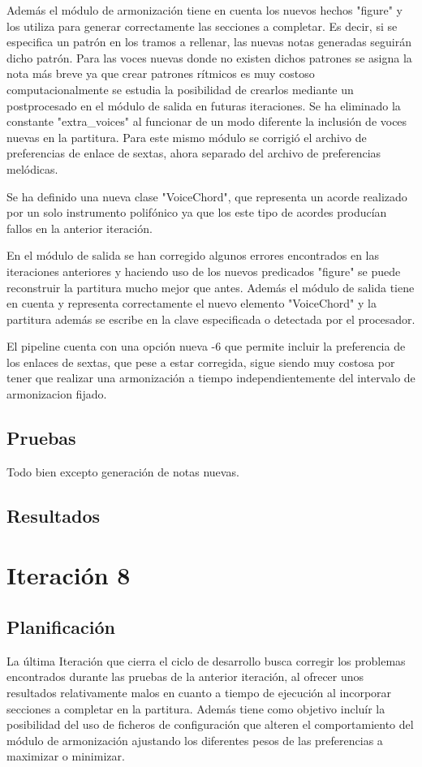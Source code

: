 Además el módulo de armonización tiene en cuenta los nuevos hechos "figure" y los utiliza para generar correctamente las secciones a completar. Es decir, si se especifica un patrón en los tramos a rellenar, las nuevas notas generadas seguirán dicho patrón. Para las voces nuevas donde no existen dichos patrones se asigna la nota más breve ya que crear patrones rítmicos es muy costoso computacionalmente se estudia la posibilidad de crearlos mediante un postprocesado en el módulo de salida en futuras iteraciones. Se ha eliminado la constante "extra\_voices" al funcionar de un modo diferente la inclusión de voces nuevas en la partitura. Para este mismo módulo se corrigió el archivo de preferencias de enlace de sextas, ahora separado del archivo de preferencias melódicas.

Se ha definido una nueva clase "VoiceChord", que representa un acorde realizado por un solo instrumento polifónico ya que los este tipo de acordes producían fallos en la anterior iteración.

En el módulo de salida se han corregido algunos errores encontrados en las iteraciones anteriores y haciendo uso de los nuevos predicados "figure" se puede reconstruir la partitura mucho mejor que antes. Además el módulo de salida tiene en cuenta y representa correctamente el nuevo elemento "VoiceChord" y la partitura además se escribe en la clave especificada o detectada por el procesador.

El pipeline cuenta con una opción nueva -6 que permite incluir la preferencia de los enlaces de sextas, que pese a estar corregida, sigue siendo muy costosa por tener que realizar una armonización a tiempo independientemente del intervalo de armonizacion fijado.

\subsection{Pruebas}
Todo bien excepto generación de notas nuevas.

\subsection{Resultados}

\section{Iteración 8}
\subsection{Planificación}
La última Iteración que cierra el ciclo de desarrollo busca corregir los problemas encontrados durante las pruebas de la anterior iteración, al ofrecer unos resultados relativamente malos en cuanto a tiempo de ejecución al incorporar secciones a completar en la partitura. Además tiene como objetivo incluír la posibilidad del uso de ficheros de configuración que alteren el comportamiento del módulo de armonización ajustando los diferentes pesos de las preferencias a maximizar o minimizar.

